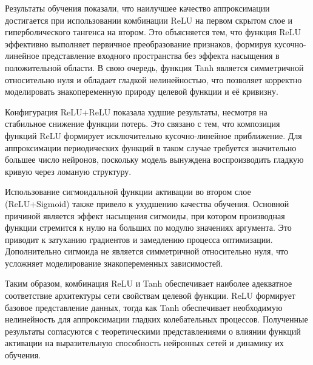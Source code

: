 \documentclass[14pt,a4paper]{extarticle}
\begin{document}
Результаты обучения показали, что наилучшее качество аппроксимации достигается при использовании комбинации ReLU на первом скрытом слое и гиперболического тангенса на втором. Это объясняется тем, что функция ReLU эффективно выполняет первичное преобразование признаков, формируя кусочно-линейное представление входного пространства без эффекта насыщения в положительной области. В свою очередь, функция Tanh является симметричной относительно нуля и обладает гладкой нелинейностью, что позволяет корректно моделировать знакопеременную природу целевой функции и её кривизну.

Конфигурация ReLU+ReLU показала худшие результаты, несмотря на стабильное снижение функции потерь. Это связано с тем, что композиция функций ReLU формирует исключительно кусочно-линейное приближение. Для аппроксимации периодических функций в таком случае требуется значительно большее число нейронов, поскольку модель вынуждена воспроизводить гладкую кривую через ломаную структуру.

Использование сигмоидальной функции активации во втором слое (ReLU+Sigmoid) также привело к ухудшению качества обучения. Основной причиной является эффект насыщения сигмоиды, при котором производная функции стремится к нулю на больших по модулю значениях аргумента. Это приводит к затуханию градиентов и замедлению процесса оптимизации. Дополнительно сигмоида не является симметричной относительно нуля, что усложняет моделирование знакопеременных зависимостей.

Таким образом, комбинация ReLU и Tanh обеспечивает наиболее адекватное соответствие архитектуры сети свойствам целевой функции. ReLU формирует базовое представление данных, тогда как Tanh обеспечивает необходимую нелинейность для аппроксимации гладких колебательных процессов. Полученные результаты согласуются с теоретическими представлениями о влиянии функций активации на выразительную способность нейронных сетей и динамику их обучения.
\end{document}
